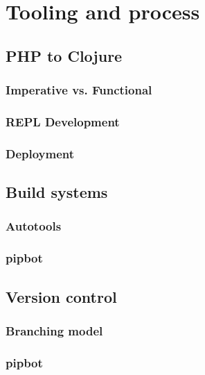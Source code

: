 \documentclass[12pt,twoside]{report}
\begin{document}




\tableofcontents
\listoffigures
\listoftables

\newpage





\chapter{Tooling and process}

\section{PHP to Clojure}
\subsection{Imperative vs. Functional}
\subsection{REPL Development}
\subsection{Deployment}

\section{Build systems}
\subsection{Autotools}
\subsection{pipbot}

\section{Version control}
\subsection{Branching model}
\subsection{pipbot}
\end{document}

